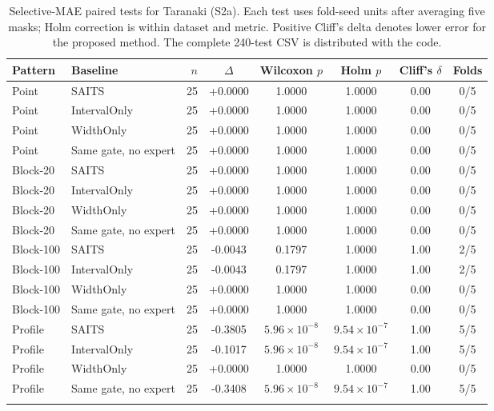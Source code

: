 \begin{table}
\caption{Selective-MAE paired tests for Taranaki (S2a).
Each test uses fold-seed units after averaging five masks; Holm correction is
within dataset and metric. Positive Cliff's delta denotes lower error for the
proposed method. The complete 240-test CSV is distributed with the code.}
\label{tab:s2a}
\centering
\scriptsize
\setlength{\tabcolsep}{3.6pt}
\begin{tabular*}{\textwidth}{@{\extracolsep{\fill}}llrccccc@{}}
\toprule
Pattern & Baseline & $n$ & $\Delta$ & Wilcoxon $p$ & Holm $p$ & Cliff's $\delta$ & Folds \\
\midrule
Point & SAITS & 25 & +0.0000 & 1.0000 & 1.0000 & 0.00 & 0/5 \\
Point & IntervalOnly & 25 & +0.0000 & 1.0000 & 1.0000 & 0.00 & 0/5 \\
Point & WidthOnly & 25 & +0.0000 & 1.0000 & 1.0000 & 0.00 & 0/5 \\
Point & Same gate, no expert & 25 & +0.0000 & 1.0000 & 1.0000 & 0.00 & 0/5 \\
\addlinespace[1.5pt]
Block-20 & SAITS & 25 & +0.0000 & 1.0000 & 1.0000 & 0.00 & 0/5 \\
Block-20 & IntervalOnly & 25 & +0.0000 & 1.0000 & 1.0000 & 0.00 & 0/5 \\
Block-20 & WidthOnly & 25 & +0.0000 & 1.0000 & 1.0000 & 0.00 & 0/5 \\
Block-20 & Same gate, no expert & 25 & +0.0000 & 1.0000 & 1.0000 & 0.00 & 0/5 \\
\addlinespace[1.5pt]
Block-100 & SAITS & 25 & -0.0043 & 0.1797 & 1.0000 & 1.00 & 2/5 \\
Block-100 & IntervalOnly & 25 & -0.0043 & 0.1797 & 1.0000 & 1.00 & 2/5 \\
Block-100 & WidthOnly & 25 & +0.0000 & 1.0000 & 1.0000 & 0.00 & 0/5 \\
Block-100 & Same gate, no expert & 25 & +0.0000 & 1.0000 & 1.0000 & 0.00 & 0/5 \\
\addlinespace[1.5pt]
Profile & SAITS & 25 & -0.3805 & $5.96\times10^{-8}$ & $9.54\times10^{-7}$ & 1.00 & 5/5 \\
Profile & IntervalOnly & 25 & -0.1017 & $5.96\times10^{-8}$ & $9.54\times10^{-7}$ & 1.00 & 5/5 \\
Profile & WidthOnly & 25 & +0.0000 & 1.0000 & 1.0000 & 0.00 & 0/5 \\
Profile & Same gate, no expert & 25 & -0.3408 & $5.96\times10^{-8}$ & $9.54\times10^{-7}$ & 1.00 & 5/5 \\
\addlinespace[1.5pt]
\bottomrule
\end{tabular*}
\end{table}


